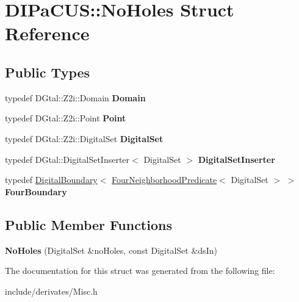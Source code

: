 \hypertarget{structDIPaCUS_1_1NoHoles}{}\section{D\+I\+Pa\+C\+US\+:\+:No\+Holes Struct Reference}
\label{structDIPaCUS_1_1NoHoles}
\subsection*{Public Types}
\begin{DoxyCompactItemize}
\item 
\mbox{\label{structDIPaCUS_1_1NoHoles_a174b13f8d525280382849f5e4af37487}} 
typedef D\+Gtal\+::\+Z2i\+::\+Domain {\bfseries Domain}
\item 
\mbox{\label{structDIPaCUS_1_1NoHoles_ae7df877cb50c010d2c33e4b030310be8}} 
typedef D\+Gtal\+::\+Z2i\+::\+Point {\bfseries Point}
\item 
\mbox{\label{structDIPaCUS_1_1NoHoles_ad144304c60d54e3913d0da6223a86b3d}} 
typedef D\+Gtal\+::\+Z2i\+::\+Digital\+Set {\bfseries Digital\+Set}
\item 
\mbox{\label{structDIPaCUS_1_1NoHoles_aa26de6effe5189ddaf1c44c1adf8921b}} 
typedef D\+Gtal\+::\+Digital\+Set\+Inserter$<$ Digital\+Set $>$ {\bfseries Digital\+Set\+Inserter}
\item 
\mbox{\label{structDIPaCUS_1_1NoHoles_a4dd39041e578448516c2f4c76b7a4776}} 
typedef \mbox{\hyperlink{structDIPaCUS_1_1DigitalBoundary}{Digital\+Boundary}}$<$ \mbox{\hyperlink{classDIPaCUS_1_1FourNeighborhoodPredicate}{Four\+Neighborhood\+Predicate}}$<$ Digital\+Set $>$ $>$ {\bfseries Four\+Boundary}
\end{DoxyCompactItemize}
\subsection*{Public Member Functions}
\begin{DoxyCompactItemize}
\item 
\mbox{\label{structDIPaCUS_1_1NoHoles_a0d33f233cf47cb5915c7db3a4f2a4963}} 
{\bfseries No\+Holes} (Digital\+Set \&no\+Holes, const Digital\+Set \&ds\+In)
\end{DoxyCompactItemize}


The documentation for this struct was generated from the following file\+:\begin{DoxyCompactItemize}
\item 
include/derivates/Misc.\+h\end{DoxyCompactItemize}
